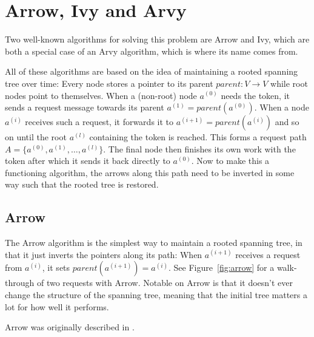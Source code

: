 \documentclass[a4paper, oneside]{discothesis}
\begin{document}
\section{Arrow, Ivy and Arvy}

Two well-known algorithms for solving this problem are Arrow and Ivy, which are both a special case of an Arvy algorithm, which is where its name comes from.

All of these algorithms are based on the idea of maintaining a rooted spanning tree over time: Every node stores a pointer to its parent $parent : V \rightarrow V$ while root nodes point to themselves. When a (non-root) node $a^{(0)}$ needs the token, it sends a request message towards its parent $a^{(1)}=parent(a^{(0)})$. When a node $a^{(i)}$ receives such a request, it forwards it to $a^{(i+1)}=parent(a^{(i)})$ and so on until the root $a^{(l)}$ containing the token is reached. This forms a request path $A=\{a^{(0)},a^{(1)},\dots,a^{(l)}\}$. The final node then finishes its own work with the token after which it sends it back directly to $a^{(0)}$. Now to make this a functioning algorithm, the arrows along this path need to be inverted in some way such that the rooted tree is restored.

\subsection{Arrow}
\label{intro:arrow}

The Arrow algorithm is the simplest way to maintain a rooted spanning tree, in that it just inverts the pointers along its path: When $a^{(i+1)}$ receives a request from $a^{(i)}$, it sets $parent(a^{(i+1)})=a^{(i)}$. See Figure~\ref{fig:arrow} for a walk-through of two requests with Arrow. Notable on Arrow is that it doesn't ever change the structure of the spanning tree, meaning that the initial tree matters a lot for how well it performs.

Arrow was originally described in \cite{Ray}.

\end{document}

